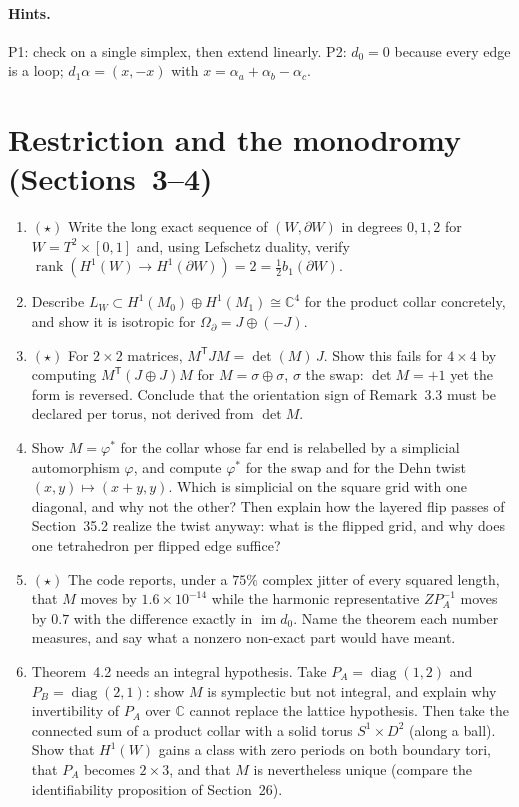 \documentclass[11pt]{article}
\newcommand{\C}{\mathbb{C}}
\newcommand{\im}{\operatorname{im}}
\newcommand{\rank}{\operatorname{rank}}
\begin{document}
\paragraph{Hints.} P1: check on a single simplex, then extend linearly. P2: $d_0 = 0$ because every edge is a loop; $d_1\alpha = (x,-x)$ with $x = \alpha_a+\alpha_b-\alpha_c$.

\section{Restriction and the monodromy (Sections~3--4)}

\begin{enumerate}[label=\textbf{P\arabic*.},leftmargin=*,start=4]
\item $(\star)$ Write the long exact sequence of $(W,\partial W)$ in degrees
  $0,1,2$ for $W = T^2\times[0,1]$ and, using Lefschetz duality, verify
  $\rank(H^1(W)\to H^1(\partial W)) = 2 = \tfrac12 b_1(\partial W)$.
\item Describe $L_W\subset H^1(M_0)\oplus H^1(M_1)\cong\C^4$ for the
  product collar concretely, and show it is isotropic for $\Omega_\partial = J\oplus(-J)$.
\item $(\star)$ For $2\times2$ matrices, $M^{\mathsf T}JM =
  \det(M)\,J$. Show this fails for $4\times4$ by computing
  $M^{\mathsf T}(J\oplus J)M$ for $M = \sigma\oplus\sigma$, $\sigma$ the swap:
  $\det M = +1$ yet the form is reversed. Conclude that the orientation sign
  of Remark~3.3 must be declared per torus, not derived from $\det M$.
\item Show $M = \varphi^*$ for the collar whose far end is relabelled by a
  simplicial automorphism $\varphi$, and compute $\varphi^*$ for the swap and
  for the Dehn twist $(x,y)\mapsto(x+y,y)$. Which is simplicial on the square
  grid with one diagonal, and why not the other? Then explain how the layered
  flip passes of Section~35.2 realize the twist anyway: what is the flipped grid,
  and why does one tetrahedron per flipped edge suffice?
\item $(\star)$ The code reports, under a $75\%$ complex jitter of every
  squared length, that $M$ moves by $1.6\times10^{-14}$ while the harmonic
  representative $Z P_A^{-1}$ moves by $0.7$ with the difference exactly in
  $\im d_0$. Name the theorem each number measures, and say what a nonzero
  non-exact part would have meant.
\item Theorem~4.2 needs an integral hypothesis. Take $P_A = \operatorname{diag}(1,2)$
  and $P_B = \operatorname{diag}(2,1)$: show $M$ is symplectic but not integral,
  and explain why invertibility of $P_A$ over $\C$ cannot replace the
  lattice hypothesis. Then take the connected sum of a product collar with a
  solid torus $S^1\times D^2$ (along a ball). Show that $H^1(W)$ gains a
  class with zero periods on both boundary tori, that $P_A$ becomes $2\times3$,
  and that $M$ is nevertheless unique (compare the identifiability
  proposition of Section~26).
\end{enumerate}
\end{document}
